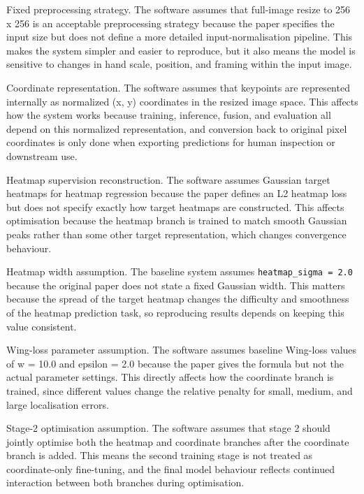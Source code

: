﻿\documentclass[11pt,a4paper]{article}
\begin{document}
Fixed preprocessing strategy. The software assumes that full-image resize to 256 x 256 is an acceptable preprocessing strategy because the paper specifies the input size but does not define a more detailed input-normalisation pipeline. This makes the system simpler and easier to reproduce, but it also means the model is sensitive to changes in hand scale, position, and framing within the input image.

\medskip

Coordinate representation. The software assumes that keypoints are represented internally as normalized (x, y) coordinates in the resized image space. This affects how the system works because training, inference, fusion, and evaluation all depend on this normalized representation, and conversion back to original pixel coordinates is only done when exporting predictions for human inspection or downstream use.

\medskip

Heatmap supervision reconstruction. The software assumes Gaussian target heatmaps for heatmap regression because the paper defines an L2 heatmap loss but does not specify exactly how target heatmaps are constructed. This affects optimisation because the heatmap branch is trained to match smooth Gaussian peaks rather than some other target representation, which changes convergence behaviour.

\medskip

Heatmap width assumption. The baseline system assumes \texttt{heatmap\_sigma = 2.0} because the original paper does not state a fixed Gaussian width. This matters because the spread of the target heatmap changes the difficulty and smoothness of the heatmap prediction task, so reproducing results depends on keeping this value consistent.

\medskip

Wing-loss parameter assumption. The software assumes baseline Wing-loss values of w = 10.0 and epsilon = 2.0 because the paper gives the formula but not the actual parameter settings. This directly affects how the coordinate branch is trained, since different values change the relative penalty for small, medium, and large localisation errors.

\medskip

Stage-2 optimisation assumption. The software assumes that stage 2 should jointly optimise both the heatmap and coordinate branches after the coordinate branch is added. This means the second training stage is not treated as coordinate-only fine-tuning, and the final model behaviour reflects continued interaction between both branches during optimisation.
\end{document}
